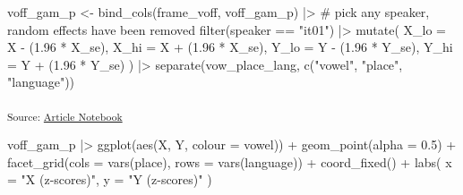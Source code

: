 \documentclass[
]{interact}
\newenvironment{Shaded}{\begin{snugshade}}{\end{snugshade}}
\newcommand{\AttributeTok}[1]{\textcolor[rgb]{0.40,0.45,0.13}{#1}}
\newcommand{\CommentTok}[1]{\textcolor[rgb]{0.37,0.37,0.37}{#1}}
\newcommand{\FloatTok}[1]{\textcolor[rgb]{0.68,0.00,0.00}{#1}}
\newcommand{\FunctionTok}[1]{\textcolor[rgb]{0.28,0.35,0.67}{#1}}
\newcommand{\NormalTok}[1]{\textcolor[rgb]{0.00,0.23,0.31}{#1}}
\newcommand{\OtherTok}[1]{\textcolor[rgb]{0.00,0.23,0.31}{#1}}
\newcommand{\SpecialCharTok}[1]{\textcolor[rgb]{0.37,0.37,0.37}{#1}}
\newcommand{\StringTok}[1]{\textcolor[rgb]{0.13,0.47,0.30}{#1}}
\begin{document}
\begin{Shaded}
\begin{Highlighting}[]
\NormalTok{voff\_gam\_p }\OtherTok{\textless{}{-}} \FunctionTok{bind\_cols}\NormalTok{(frame\_voff, voff\_gam\_p) }\SpecialCharTok{|\textgreater{}} 
  \CommentTok{\# pick any speaker, random effects have been removed}
  \FunctionTok{filter}\NormalTok{(speaker }\SpecialCharTok{==} \StringTok{"it01"}\NormalTok{) }\SpecialCharTok{|\textgreater{}} 
  \FunctionTok{mutate}\NormalTok{(}
    \AttributeTok{X\_lo =}\NormalTok{ X }\SpecialCharTok{{-}}\NormalTok{ (}\FloatTok{1.96} \SpecialCharTok{*}\NormalTok{ X\_se),}
    \AttributeTok{X\_hi =}\NormalTok{ X }\SpecialCharTok{+}\NormalTok{ (}\FloatTok{1.96} \SpecialCharTok{*}\NormalTok{ X\_se),}
    \AttributeTok{Y\_lo =}\NormalTok{ Y }\SpecialCharTok{{-}}\NormalTok{ (}\FloatTok{1.96} \SpecialCharTok{*}\NormalTok{ Y\_se),}
    \AttributeTok{Y\_hi =}\NormalTok{ Y }\SpecialCharTok{+}\NormalTok{ (}\FloatTok{1.96} \SpecialCharTok{*}\NormalTok{ Y\_se)}
\NormalTok{  ) }\SpecialCharTok{|\textgreater{}} 
  \FunctionTok{separate}\NormalTok{(vow\_place\_lang, }\FunctionTok{c}\NormalTok{(}\StringTok{"vowel"}\NormalTok{, }\StringTok{"place"}\NormalTok{, }\StringTok{"language"}\NormalTok{))}
\end{Highlighting}
\end{Shaded}

\textsubscript{Source:
\href{https://stefanocoretta.github.io/mv_uti/index.qmd.html}{Article
Notebook}}

\label{cell-fig-voff-pred}
\begin{Shaded}
\begin{Highlighting}[]
\NormalTok{voff\_gam\_p }\SpecialCharTok{|\textgreater{}} 
  \FunctionTok{ggplot}\NormalTok{(}\FunctionTok{aes}\NormalTok{(X, Y, }\AttributeTok{colour =}\NormalTok{ vowel)) }\SpecialCharTok{+}
  \FunctionTok{geom\_point}\NormalTok{(}\AttributeTok{alpha =} \FloatTok{0.5}\NormalTok{) }\SpecialCharTok{+}
  \FunctionTok{facet\_grid}\NormalTok{(}\AttributeTok{cols =} \FunctionTok{vars}\NormalTok{(place), }\AttributeTok{rows =} \FunctionTok{vars}\NormalTok{(language)) }\SpecialCharTok{+}
  \FunctionTok{coord\_fixed}\NormalTok{() }\SpecialCharTok{+}
  \FunctionTok{labs}\NormalTok{(}
    \AttributeTok{x =} \StringTok{"X (z{-}scores)"}\NormalTok{,}
    \AttributeTok{y =} \StringTok{"Y (z{-}scores)"}
\NormalTok{  )}
\end{Highlighting}
\end{Shaded}
\end{document}
